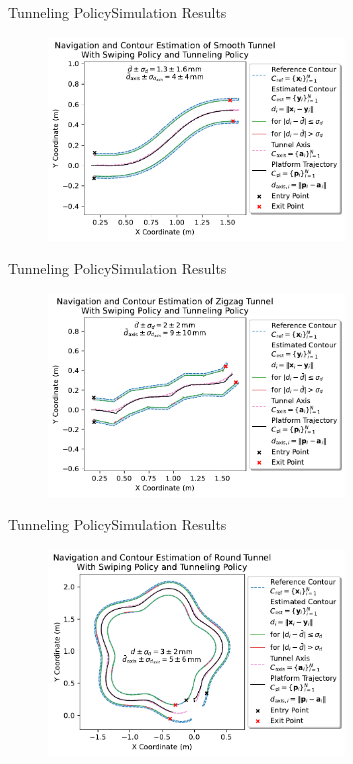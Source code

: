 \documentclass[AIRbeamer
,optEnglish
,optBiber
,optBibstyleAlphabetic
,optBeamerClassicFormat%
]{AIRlatex}
\begin{document}
    \begin{frame}{Tunneling Policy}{Simulation Results}
        \begin{figure}[htb]
            \centering
            \includegraphics[width=0.7\textwidth]{figures/experiments/smooth-tunnel-swiping-tunneling}
        \end{figure}
    \end{frame}
    \begin{frame}{Tunneling Policy}{Simulation Results}
        \begin{figure}[htb]
            \centering
            \includegraphics[width=0.7\textwidth]{figures/experiments/zigzag-tunnel-swiping-tunneling}
        \end{figure}
    \end{frame}
    \begin{frame}{Tunneling Policy}{Simulation Results}
        \begin{figure}[htb]
            \centering
            \includegraphics[width=0.7\textwidth]{figures/experiments/round-tunnel-swiping-tunneling}
        \end{figure}
    \end{frame}
\end{document}
